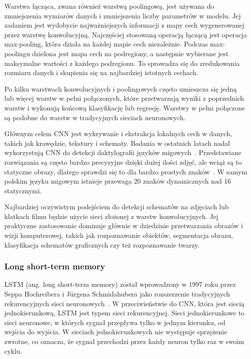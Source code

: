 Warstwa łącząca, zwana również warstwą poolingową, jest używana do zmniejszenia wymiarów danych i zmniejszenia liczby parametrów w modelu. Jej zadaniem jest wydobycie najważniejszych informacji z mapy cech wygenerowanej przez warstwę konwolucyjną. Najczęściej stosowaną operacją łączącą jest operacja max-pooling, która działa na każdej mapie cech niezależnie. Podczas max-poolingu dzielona jest mapa cech na podregiony, a następnie wybierane jest maksymalne wartości z każdego podregionu. To sprowadza się do zredukowania rozmiaru danych i skupienia się na najbardziej istotnych cechach.

Po kilku warstwach konwolucyjnych i poolingowych często umieszcza się jedną lub więcej warstw w pełni połączonych, które przetwarzają wyniki z poprzednich warstw i wykonują końcową klasyfikację lub regresję. Warstwy w pełni połączone są podobne do warstw w tradycyjnych sieciach neuronowych.

Głównym celem CNN jest wykrywanie i ekstrakcja lokalnych cech w danych, takich jak krawędzie, tekstury i schematy. Badania w ostatnich latach nadal wykorzystują CNN do detekcji daktylografii języków migowych~\cite{rastgoo2021}. Przedstawiane rozwiązania są często bardzo precyzyjne dzięki dużej ilości zdjęć, ale wciąż są to statyczne obrazy, dlatego sprawdzi się to dla bardzo prostych znaków~\cite{cheok2019}. W samym polskim języku migowym istnieje przewaga 20 znaków dynamicznych nad 16 statycznymi.

Najbardziej oczywistym podejściem do detekcji schematów na zdjęciach lub klatkach filmu będzie użycie sieci złożonej z warstw konwolucyjnych. Jej praktyczne zastosowanie dominuje głównie w dziedzinie przetwarzania obrazów i wizji komputerowej, takich jak rozpoznawanie obiektów, segmentacja obrazu, klasyfikacja schematów graficznych czy też rozpoznawanie twarzy.

\subsubsection{Long short-term memory}
\label{subsubsec:long-short-term-memory}

LSTM (ang. long short-term memory) został wprowadzony w 1997 roku przez Seppa Hochreibera i Jürgena Schmidahubera jako rozszerzenie tradycyjnych rekurencyjnych sieci neuronowych~\cite{hochreiter1997}. W przeciwieństwie do CNN, która jest siecią jednokierunkową, LSTM jest typem sieci rekurencyjnej. Sieci jednokierunkowe to sieci neuronowe, w których sygnał przepływa tylko w jednym kierunku, od wejścia do wyjścia. W sieciach jednokierunkowych nie występuje sprzężenie zwrotne, co oznacza, że sygnał przechodzi przez każdy neuron tylko raz w swoim cyklu.

